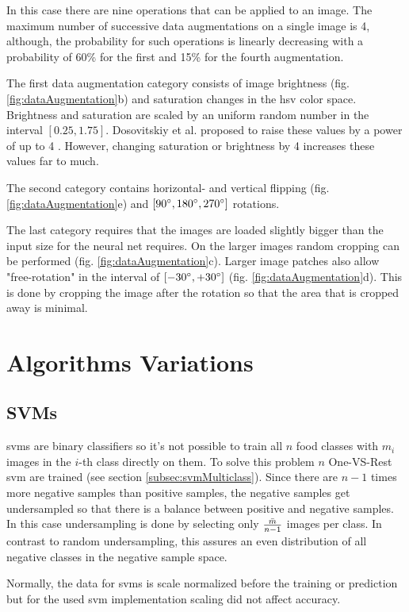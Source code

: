In this case there are nine operations that can be applied to an image. The maximum number of successive data augmentations on a single image is 4, although, the probability for such operations is linearly decreasing with a probability of 60\% for the first and 15\% for the fourth augmentation.

The first data augmentation category consists of image brightness {(fig. \ref{fig:dataAugmentation}b)} and saturation changes in the \gls{hsv} color space. Brightness and saturation are scaled by an uniform random number in the interval $[0.25,1.75]$. Dosovitskiy et al. proposed to raise these values by a power of up to 4 \cite{Dosovitskiy2013}. However, changing saturation or brightness by 4 increases these values far to much.

The second category contains horizontal- and vertical flipping {(fig. \ref{fig:dataAugmentation}e)} and $[90\degree , 180\degree, 270\degree ]$ rotations.

The last category requires that the images are loaded slightly bigger than the input size for the neural net requires. On the larger images random cropping can be performed {(fig. \ref{fig:dataAugmentation}c)}. Larger image patches also allow "free-rotation" in the interval of $[-30\degree, +30\degree]$ {(fig. \ref{fig:dataAugmentation}d)}. This is done by cropping the image after the rotation so that the area that is cropped away is minimal.


\section{Algorithms Variations}

\subsection{SVMs}
\glspl{svm} are binary classifiers so it's not possible to train all $n$ food classes with $m_i$ images in the $i$-th class directly on them. To solve this problem $n$ One-VS-Rest \gls{svm} are trained {(see section \ref{subsec:svmMulticlass})}. Since there are $n-1$ times more negative samples than positive samples, the negative samples get undersampled so that there is a balance between positive and negative samples. In this case undersampling is done by selecting only $\frac{\bar{m}}{n-1}$ images per class. In contrast to random undersampling, this assures an even distribution of all negative classes in the negative sample space. 

Normally, the data for \glspl{svm} is scale normalized before the training or prediction but for the used \gls{svm} implementation scaling did not affect accuracy. 

